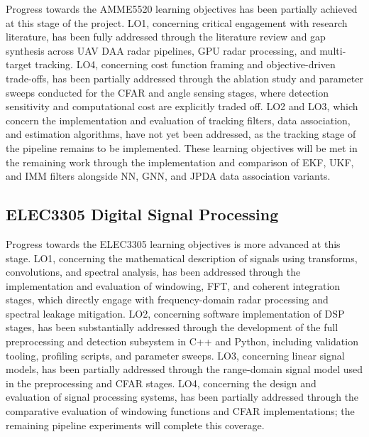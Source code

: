 Progress towards the AMME5520 learning objectives has been partially achieved at 
this stage of the project. LO1, concerning critical engagement with research 
literature, has been fully addressed through the literature review and gap 
synthesis across UAV DAA radar pipelines, GPU radar processing, and multi-target 
tracking. LO4, concerning cost function framing and objective-driven trade-offs, 
has been partially addressed through the ablation study and parameter sweeps 
conducted for the CFAR and angle sensing stages, where detection sensitivity 
and computational cost are explicitly traded off. LO2 and LO3, which concern 
the implementation and evaluation of tracking filters, data association, and 
estimation algorithms, have not yet been addressed, as the tracking stage of the 
pipeline remains to be implemented. These learning objectives will be met in the 
remaining work through the implementation and comparison of EKF, UKF, and IMM 
filters alongside NN, GNN, and JPDA data association variants.

\subsection{ELEC3305 Digital Signal Processing}

Progress towards the ELEC3305 learning objectives is more advanced at this stage. 
LO1, concerning the mathematical description of signals using transforms, 
convolutions, and spectral analysis, has been addressed through the implementation 
and evaluation of windowing, FFT, and coherent integration stages, which directly 
engage with frequency-domain radar processing and spectral leakage mitigation. 
LO2, concerning software implementation of DSP stages, has been substantially 
addressed through the development of the full preprocessing and detection subsystem 
in C++ and Python, including validation tooling, profiling scripts, and parameter 
sweeps. LO3, concerning linear signal models, has been partially addressed through 
the range-domain signal model used in the preprocessing and CFAR stages. LO4, 
concerning the design and evaluation of signal processing systems, has been 
partially addressed through the comparative evaluation of windowing functions 
and CFAR implementations; the remaining pipeline experiments will complete this coverage.
